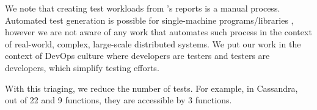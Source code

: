 \begin{enumerate}
We note that creating test workloads from \sfind's reports is a manual
process.  Automated test generation is possible for single-machine
programs/libraries \cite{Cadar+08-KLEE}, however we are not aware of any
work that automates such process in the context of real-world, complex,
large-scale distributed systems.
%
We put our work in the context of DevOps culture
\cite{Limoncelli+11-Devops} where developers are testers and testers are
developers, which simplify testing efforts.

\end{enumerate}

With this triaging, we reduce the
number of tests.  For example, in Cassandra, out of 22 \oonn and 9 \oonnn
functions, they are accessible by 3 \oonnn functions.
\fi



